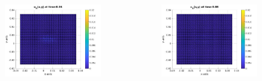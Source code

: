 \documentclass[8pt]{beamer}
\begin{document}
\begin{frame}
\begin{columns}
	    \begin{column}{0.25\textwidth}
		    \begin{figure}[h]
			    \includegraphics[width=\textwidth]{tc1-1/006.jpg}
		\end{figure}
	    \end{column}
	    \begin{column}{0.25\textwidth}
		    \begin{figure}[h]
			    \includegraphics[width=\textwidth]{tc1-1/008.jpg}
		    \end{figure}
	\end{column}
	\end{columns}
    \begin{columns}
    	\begin{column}{0.25\textwidth}

\end{column}
\end{columns}
\end{frame}
\end{document}
